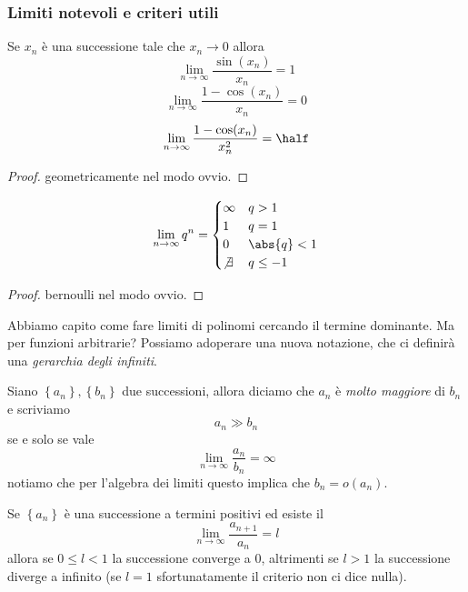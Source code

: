 \documentclass[11pt]{scrartcl}
\begin{document}
	\subsubsection{Limiti notevoli e criteri utili}
	\begin{lemma}
		Se $x_n$ è una successione tale che $x_n\to 0$ allora
		$$\lim_{n\to\infty}\frac{\sin(x_n)}{x_n}=1$$
		$$\lim_{n\to\infty}\frac{1-\cos(x_n)}{x_n}=0$$
		$$\lim_{n\to \infty}\frac{1-\cos(x_n)}{x_n^2}=\half$$
	\end{lemma}
	\begin{proof}
		geometricamente nel modo ovvio.
	\end{proof}
	\begin{lemma}\label{Limiti notevoli della funzione potenza}
		$$\lim_{n\to \infty}q^n=
		\begin{cases}
			\infty & q>1 \\
			1 & q=1 \\
			0 & \abs{q}<1 \\
			\not\exists & q\le -1
		\end{cases}
		$$
	\end{lemma}
	\begin{proof}
		bernoulli nel modo ovvio.
	\end{proof}
	Abbiamo capito come fare limiti di polinomi cercando il termine dominante. Ma per funzioni arbitrarie? Possiamo adoperare una nuova notazione, che ci definirà una \textit{gerarchia degli infiniti}.
	\begin{definition}
		Siano $\left\{a_n\right\},\left\{b_n\right\}$ due successioni, allora diciamo che $a_n$ è \textit{molto maggiore} di $b_n$ e scriviamo 
		$$a_n\gg b_n$$
		se e solo se vale
		$$\lim_{n\to\infty}\frac{a_n}{b_n}=\infty$$
		notiamo che per l'algebra dei limiti questo implica che $b_n=o(a_n)$. 
	\end{definition}
	\begin{lemma}
		Se $\left\{a_n\right\}$ è una successione a termini positivi ed esiste il
		$$\lim_{n\to\infty}\frac{a_{n+1}}{a_n}=l$$
		allora se $0\le l <1$ la successione converge a $0$, altrimenti se $l>1$ la successione diverge a infinito (se $l=1$ sfortunatamente il criterio non ci dice nulla).
	\end{lemma}
\end{document}

